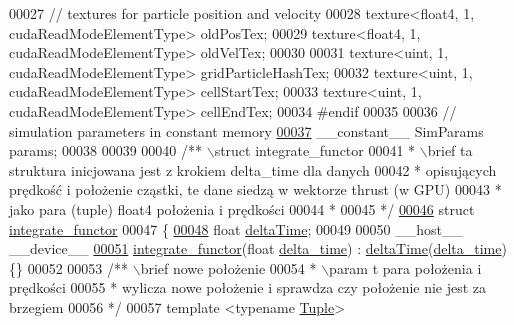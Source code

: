 \begin{DoxyCode}
00027 \textcolor{comment}{// textures for particle position and velocity}
00028 texture<float4, 1, cudaReadModeElementType> oldPosTex;
00029 texture<float4, 1, cudaReadModeElementType> oldVelTex;
00030 
00031 texture<uint, 1, cudaReadModeElementType> gridParticleHashTex;
00032 texture<uint, 1, cudaReadModeElementType> cellStartTex;
00033 texture<uint, 1, cudaReadModeElementType> cellEndTex;
00034 \textcolor{preprocessor}{#}\textcolor{preprocessor}{endif}
00035 
00036 \textcolor{comment}{// simulation parameters in constant memory}
\hypertarget{particles__kernel__impl_8cuh_source_l00037}{}\hyperlink{particles__kernel__impl_8cuh_a8db8938e28edd17862daf58651051bdc}{00037} \_\_constant\_\_ SimParams params;
00038 
00039 
00040 \textcolor{comment}{/** \(\backslash\)struct integrate\_functor}
00041 \textcolor{comment}{ * \(\backslash\)brief ta struktura inicjowana jest z krokiem delta\_time dla danych}
00042 \textcolor{comment}{ * opisujących prędkość i położenie cząstki, te dane siedzą w wektorze thrust (w GPU)}
00043 \textcolor{comment}{ * jako para (tuple) float4 położenia i prędkości}
00044 \textcolor{comment}{ *}
00045 \textcolor{comment}{ */}
\hypertarget{particles__kernel__impl_8cuh_source_l00046}{}\hyperlink{structintegrate__functor}{00046} \textcolor{keyword}{struct} \hyperlink{structintegrate__functor_a772e86ead8690332beb50911e4448f81}{integrate\_functor}
00047 \{
\hypertarget{particles__kernel__impl_8cuh_source_l00048}{}\hyperlink{structintegrate__functor_a06dce1826719cd5b2a9fdd9f566da754}{00048}     \textcolor{keywordtype}{float} \hyperlink{structintegrate__functor_a06dce1826719cd5b2a9fdd9f566da754}{deltaTime};
00049 
00050     \_\_host\_\_ \_\_device\_\_
\hypertarget{particles__kernel__impl_8cuh_source_l00051}{}\hyperlink{structintegrate__functor_a13075d4c547ba22c37137ff2b874ae45}{00051}     \hyperlink{structintegrate__functor_a772e86ead8690332beb50911e4448f81}{integrate\_functor}(\textcolor{keywordtype}{float} \hyperlink{structintegrate__functor_a772e86ead8690332beb50911e4448f81}{delta\_time}) : 
      \hyperlink{structintegrate__functor_a772e86ead8690332beb50911e4448f81}{deltaTime}(\hyperlink{structintegrate__functor_a772e86ead8690332beb50911e4448f81}{delta\_time}) \{\}
00052 
00053     \textcolor{comment}{/** \(\backslash\)brief nowe położenie}
00054 \textcolor{comment}{     * \(\backslash\)param t para położenia i prędkości}
00055 \textcolor{comment}{     * wylicza nowe położenie i sprawdza czy położenie nie jest za brzegiem}
00056 \textcolor{comment}{     */}
00057     \textcolor{keyword}{template} <\textcolor{keyword}{typename} \hyperlink{structintegrate__functor_a772e86ead8690332beb50911e4448f81}{Tuple}>

\end{DoxyCode}

